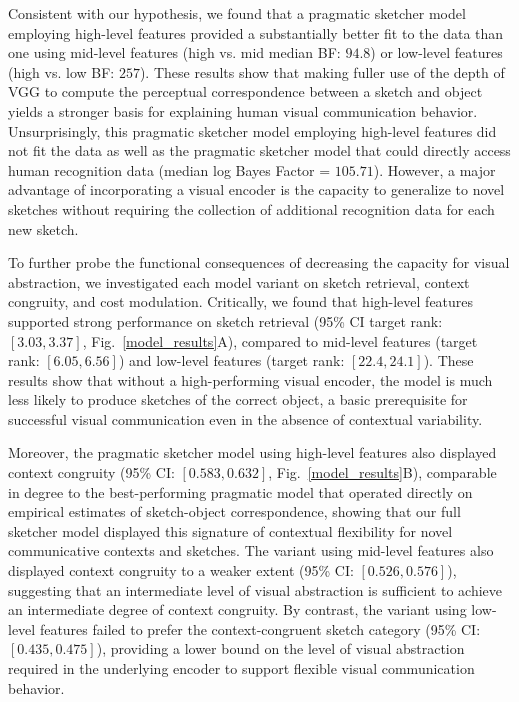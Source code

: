 \documentclass[9pt,twocolumn,twoside]{pnas-new}
\begin{document}
Consistent with our hypothesis, we found that a pragmatic sketcher model employing high-level features provided a substantially better fit to the data than one using mid-level features (high vs. mid median BF: $94.8$) or low-level features (high vs. low BF: $257$).
These results show that making fuller use of the depth of VGG to compute the perceptual correspondence between a sketch and object yields a stronger basis for explaining human visual communication behavior.
Unsurprisingly, this pragmatic sketcher model employing high-level features did not fit the data as well as the pragmatic sketcher model that could directly access human recognition data (median log Bayes Factor = $105.71$).
However, a major advantage of incorporating a visual encoder is the capacity to generalize to novel sketches without requiring the collection of additional recognition data for each new sketch.

To further probe the functional consequences of decreasing the capacity for visual abstraction, we investigated each model variant on sketch retrieval, context congruity, and cost modulation. 
Critically, we found that high-level features supported strong performance on sketch retrieval (95\% CI target rank: $[3.03, 3.37]$, Fig.~\ref{model_results}A), compared to mid-level features (target rank: $[6.05, 6.56]$) and low-level features (target rank: $[22.4, 24.1]$). 
These results show that without a high-performing visual encoder, the model is much less likely to produce sketches of the correct object, a basic prerequisite for successful visual communication even in the absence of contextual variability. 

Moreover, the pragmatic sketcher model using high-level features also displayed context congruity (95\% CI: $[0.583, 0.632]$, Fig.~\ref{model_results}B), comparable in degree to the best-performing pragmatic model that operated directly on empirical estimates of sketch-object correspondence, showing that our full sketcher model displayed this signature of contextual flexibility for novel communicative contexts and sketches. 
The variant using mid-level features also displayed context congruity to a weaker extent (95\% CI: $[0.526, 0.576]$), suggesting that an intermediate level of visual abstraction is sufficient to achieve an intermediate degree of context congruity. 
By contrast, the variant using low-level features failed to prefer the context-congruent sketch category (95\% CI: $[0.435, 0.475]$), providing a lower bound on the level of visual abstraction required in the underlying encoder to support flexible visual communication behavior. 
\end{document}
